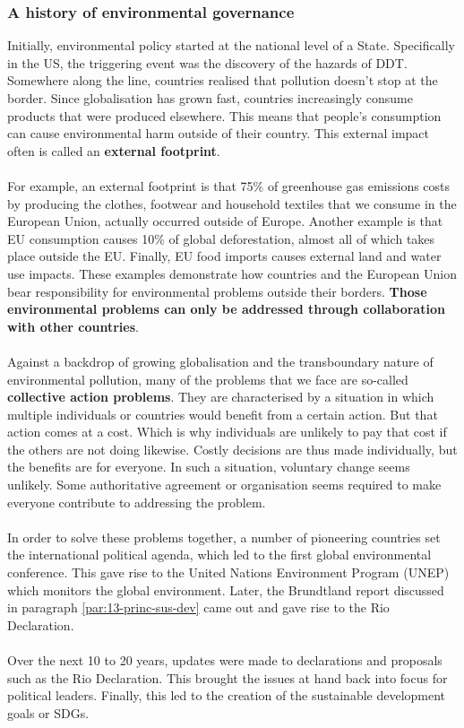 \documentclass[../summary.tex]{subfiles}
\begin{document}
\subsubsection{A history of environmental governance}
Initially, environmental policy started at the national level of a State. Specifically in the US, the triggering event was the discovery of the hazards of DDT. Somewhere along the line, countries realised that pollution doesn't stop at the border. Since globalisation has grown fast, countries increasingly consume products that were produced elsewhere.
This means that people's consumption can cause environmental harm outside of their country. This external impact often is called an \textbf{external footprint}.
\\\\
For example, an external footprint is that 75\% of greenhouse gas emissions costs by producing the clothes, footwear and household textiles that we consume in the European Union, actually occurred outside of Europe. Another example is that EU consumption causes 10\% of global deforestation, almost all of which takes place outside the EU. Finally, EU food imports causes external land and water use impacts. These examples demonstrate how countries and the European Union bear responsibility for environmental problems outside their borders. \textbf{Those environmental problems can only be addressed through collaboration with other countries}.
\\\\
Against a backdrop of growing globalisation and the transboundary nature of environmental pollution, many of the problems that we face are so-called \textbf{collective action problems}. They are characterised by a situation in which multiple individuals or countries would benefit from a certain action. But that action comes at a cost. Which is why individuals are unlikely to pay that cost if the others are not doing likewise. Costly decisions are thus made individually, but the benefits are for everyone. In such a situation, voluntary change seems unlikely. Some authoritative agreement or organisation seems required to make everyone contribute to addressing the problem.
\\\\
In order to solve these problems together, a number of pioneering countries set the international political agenda, which led to the first global environmental conference. This gave rise to the United Nations Environment Program (UNEP) which monitors the global environment. Later, the Brundtland report discussed in paragraph \ref{par:13-princ-sus-dev} came out and gave rise to the Rio Declaration.
\\\\
Over the next 10 to 20 years, updates were made to declarations and proposals such as the Rio Declaration. This brought the issues at hand back into focus for political leaders. Finally, this led to the creation of the sustainable development goals or SDGs.
\end{document}
